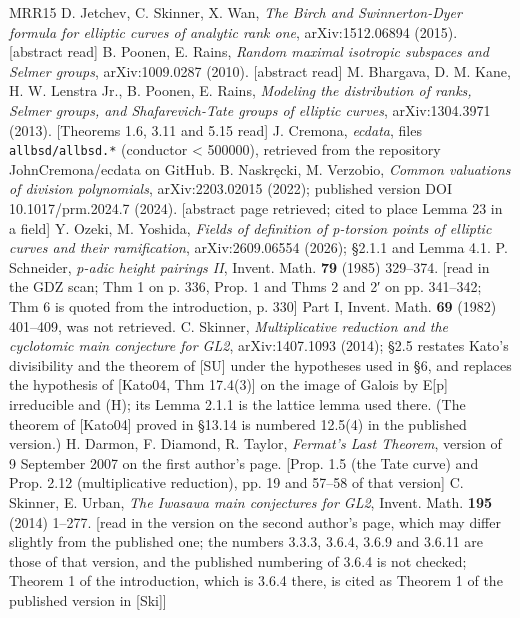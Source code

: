\documentclass[11pt,a4paper]{article}
\theoremstyle{named}
\begin{document}
\begin{thebibliography}{MRR15}
 D. Jetchev, C. Skinner, X. Wan, \textit{The Birch and Swinnerton-Dyer formula for elliptic curves of analytic rank one}, arXiv:1512.06894 (2015). [abstract read]
 B. Poonen, E. Rains, \textit{Random maximal isotropic subspaces and Selmer groups}, arXiv:1009.0287 (2010). [abstract read]
 M. Bhargava, D. M. Kane, H. W. Lenstra Jr., B. Poonen, E. Rains, \textit{Modeling the distribution of ranks, Selmer groups, and Shafarevich-Tate groups of elliptic curves}, arXiv:1304.3971 (2013). [Theorems 1.6, 3.11 and 5.15 read]
 J. Cremona, \textit{ecdata}, files \texttt{allbsd/allbsd.\allowbreak{}*} (conductor \textless{} 500000), retrieved from the repository JohnCremona/ecdata on GitHub.
 B. Naskręcki, M. Verzobio, \textit{Common valuations of division polynomials}, arXiv:2203.02015 (2022); published version DOI 10.1017/prm.2024.7 (2024). [abstract page retrieved; cited to place Lemma 23 in a field]
 Y. Ozeki, M. Yoshida, \textit{Fields of definition of p-torsion points of elliptic curves and their ramification}, arXiv:2609.06554 (2026); §2.1.1 and Lemma 4.1.
 P. Schneider, \textit{p-adic height pairings II}, Invent. Math. \textbf{79} (1985) 329–374. [read in the GDZ scan; Thm 1 on p. 336, Prop. 1 and Thms 2 and 2′ on pp. 341–342; Thm 6 is quoted from the introduction, p. 330] Part I, Invent. Math. \textbf{69} (1982) 401–409, was not retrieved.
 C. Skinner, \textit{Multiplicative reduction and the cyclotomic main conjecture for GL2}, arXiv:1407.1093 (2014); §2.5 restates Kato's divisibility and the theorem of [SU] under the hypotheses used in §6, and replaces the hypothesis of [Kato04, Thm 17.4(3)] on the image of Galois by E[p] irreducible and (H); its Lemma 2.1.1 is the lattice lemma used there. (The theorem of [Kato04] proved in §13.14 is numbered 12.5(4) in the published version.)
 H. Darmon, F. Diamond, R. Taylor, \textit{Fermat's Last Theorem}, version of 9 September 2007 on the first author's page. [Prop. 1.5 (the Tate curve) and Prop. 2.12 (multiplicative reduction), pp. 19 and 57–58 of that version]
 C. Skinner, E. Urban, \textit{The Iwasawa main conjectures for GL2}, Invent. Math. \textbf{195} (2014) 1–277. [read in the version on the second author's page, which may differ slightly from the published one; the numbers 3.3.3, 3.6.4, 3.6.9 and 3.6.11 are those of that version, and the published numbering of 3.6.4 is not checked; Theorem 1 of the introduction, which is 3.6.4 there, is cited as Theorem 1 of the published version in [Ski]]

\end{thebibliography}
\end{document}
